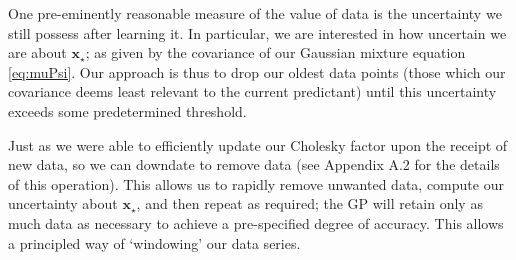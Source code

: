 \documentclass{acmtrans2m}
\newcommand{\vect}[1]{\boldsymbol{#1}}
\newcommand{\vx}{\vect{x}}
\newcommand{\vxst}{\vx_\star}
\begin{document}
One pre-eminently reasonable measure of the value of data is the uncertainty we still possess after learning it. In particular, we are interested in how uncertain we are about $\vxst$; as given by the covariance of our Gaussian mixture equation \eqref{eq:muPsi}. Our approach is thus to drop our oldest data points (those which our covariance deems least relevant to the current predictant) until this uncertainty exceeds some predetermined threshold. 

Just as we were able to efficiently update our Cholesky factor upon the receipt of new data, so we can downdate to remove data (see Appendix A.2 for the details of this operation). This allows us to rapidly remove unwanted data, compute our uncertainty about $\vxst$, and then repeat as required; the GP will retain only as much data as necessary to achieve a pre-specified degree of accuracy. This allows a principled way of `windowing' our data series.
\end{document}
